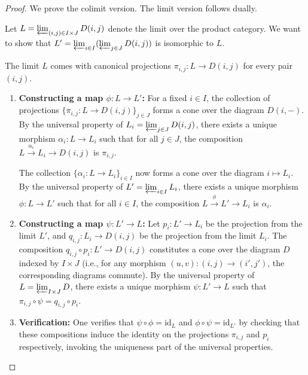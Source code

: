 \begin{proof}
    We prove the colimit version. The limit version follows dually.

    Let $L = \varprojlim_{(i, j) \in I \times J} D(i, j)$ denote the limit over the product category. We want to show that $L' = \varprojlim_{i \in I} (\varprojlim_{j \in J} D(i, j))$ is isomorphic to $L$.

    The limit $L$ comes with canonical projections $\pi_{i,j} : L \to D(i, j)$ for every pair $(i, j)$.
    
    \begin{enumerate}
        \item \textbf{Constructing a map $\phi: L \to L'$:}
        For a fixed $i \in I$, the collection of projections $\{\pi_{i,j} : L \to D(i, j)\}_{j \in J}$ forms a cone over the diagram $D(i, -)$. By the universal property of $L_i = \varprojlim_{j \in J} D(i, j)$, there exists a unique morphism $\alpha_i : L \to L_i$ such that for all $j \in J$, the composition $L \xrightarrow{\alpha_i} L_i \to D(i, j)$ is $\pi_{i,j}$.
        
        The collection $\{\alpha_i : L \to L_i\}_{i \in I}$ now forms a cone over the diagram $i \mapsto L_i$. By the universal property of $L' = \varprojlim_{i \in I} L_i$, there exists a unique morphism $\phi: L \to L'$ such that for all $i \in I$, the composition $L \xrightarrow{\phi} L' \to L_i$ is $\alpha_i$.

        \item \textbf{Constructing a map $\psi: L' \to L$:}
        Let $p_i : L' \to L_i$ be the projection from the limit $L'$, and $q_{i,j} : L_i \to D(i, j)$ be the projection from the limit $L_i$. The composition $q_{i,j} \circ p_i : L' \to D(i, j)$ constitutes a cone over the diagram $D$ indexed by $I \times J$ (i.e., for any morphism $(u, v) : (i, j) \to (i', j')$, the corresponding diagrams commute). By the universal property of $L = \varprojlim_{I \times J} D$, there exists a unique morphism $\psi: L' \to L$ such that $\pi_{i,j} \circ \psi = q_{i,j} \circ p_i$.

        \item \textbf{Verification:}
        One verifies that $\psi \circ \phi = \text{id}_L$ and $\phi \circ \psi = \text{id}_{L'}$ by checking that these compositions induce the identity on the projections $\pi_{i,j}$ and $p_i$ respectively, invoking the uniqueness part of the universal properties.
    \end{enumerate}
\end{proof}
